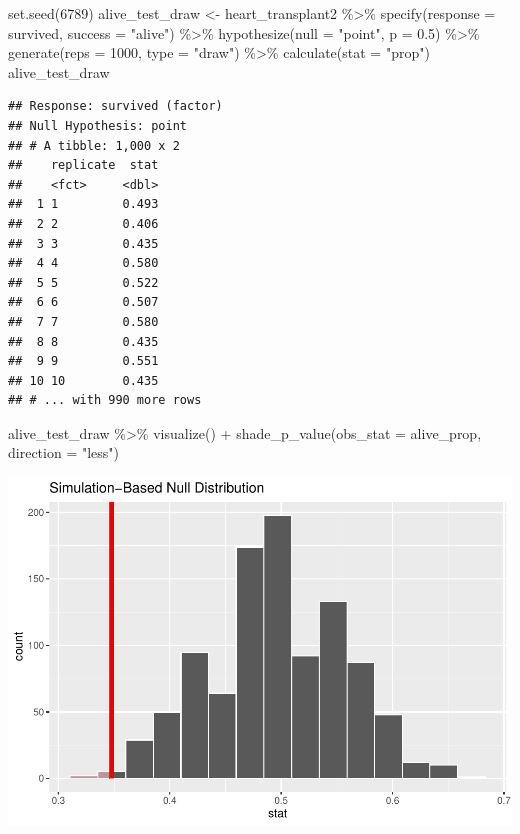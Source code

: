 \documentclass[
]{book}
\newenvironment{Shaded}{\begin{snugshade}}{\end{snugshade}}
\newcommand{\AttributeTok}[1]{\textcolor[rgb]{0.77,0.63,0.00}{#1}}
\newcommand{\DecValTok}[1]{\textcolor[rgb]{0.00,0.00,0.81}{#1}}
\newcommand{\FloatTok}[1]{\textcolor[rgb]{0.00,0.00,0.81}{#1}}
\newcommand{\FunctionTok}[1]{\textcolor[rgb]{0.00,0.00,0.00}{#1}}
\newcommand{\NormalTok}[1]{#1}
\newcommand{\OtherTok}[1]{\textcolor[rgb]{0.56,0.35,0.01}{#1}}
\newcommand{\SpecialCharTok}[1]{\textcolor[rgb]{0.00,0.00,0.00}{#1}}
\newcommand{\StringTok}[1]{\textcolor[rgb]{0.31,0.60,0.02}{#1}}
\begin{document}
\begin{Shaded}
\begin{Highlighting}[]
\FunctionTok{set.seed}\NormalTok{(}\DecValTok{6789}\NormalTok{)}
\NormalTok{alive\_test\_draw }\OtherTok{\textless{}{-}}\NormalTok{ heart\_transplant2 }\SpecialCharTok{\%\textgreater{}\%}
    \FunctionTok{specify}\NormalTok{(}\AttributeTok{response =}\NormalTok{ survived, }\AttributeTok{success =} \StringTok{"alive"}\NormalTok{) }\SpecialCharTok{\%\textgreater{}\%}
    \FunctionTok{hypothesize}\NormalTok{(}\AttributeTok{null =} \StringTok{"point"}\NormalTok{, }\AttributeTok{p =} \FloatTok{0.5}\NormalTok{) }\SpecialCharTok{\%\textgreater{}\%}
    \FunctionTok{generate}\NormalTok{(}\AttributeTok{reps =} \DecValTok{1000}\NormalTok{, }\AttributeTok{type =} \StringTok{"draw"}\NormalTok{) }\SpecialCharTok{\%\textgreater{}\%}
    \FunctionTok{calculate}\NormalTok{(}\AttributeTok{stat =} \StringTok{"prop"}\NormalTok{)}
\NormalTok{alive\_test\_draw}
\end{Highlighting}
\end{Shaded}

\begin{verbatim}
## Response: survived (factor)
## Null Hypothesis: point
## # A tibble: 1,000 x 2
##    replicate  stat
##    <fct>     <dbl>
##  1 1         0.493
##  2 2         0.406
##  3 3         0.435
##  4 4         0.580
##  5 5         0.522
##  6 6         0.507
##  7 7         0.580
##  8 8         0.435
##  9 9         0.551
## 10 10        0.435
## # ... with 990 more rows
\end{verbatim}

\begin{Shaded}
\begin{Highlighting}[]
\NormalTok{alive\_test\_draw }\SpecialCharTok{\%\textgreater{}\%}
    \FunctionTok{visualize}\NormalTok{() }\SpecialCharTok{+}
    \FunctionTok{shade\_p\_value}\NormalTok{(}\AttributeTok{obs\_stat =}\NormalTok{ alive\_prop, }\AttributeTok{direction =} \StringTok{"less"}\NormalTok{)}
\end{Highlighting}
\end{Shaded}

\includegraphics{intro_stats_files/figure-latex/unnamed-chunk-392-1.pdf}
\end{document}
